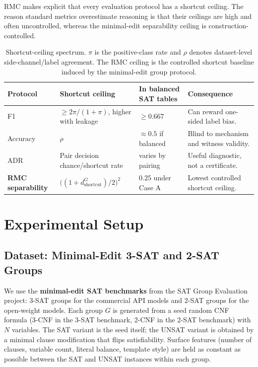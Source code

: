 \documentclass[conference]{IEEEtran}
\theoremstyle{remark}
\newcommand{\shortcutDisc}{d_{\mathrm{shortcut}}^{G}}
\begin{document}
RMC makes explicit that every evaluation
protocol has a shortcut ceiling.
The reason standard metrics overestimate reasoning is that their ceilings are
high and often uncontrolled, whereas the minimal-edit separability ceiling is
construction-controlled.

\begin{table}[t]
\centering
\caption{Shortcut-ceiling spectrum.  $\pi$ is the positive-class rate and $\rho$
denotes dataset-level side-channel/label agreement.  The RMC ceiling is the
controlled shortcut baseline induced by the minimal-edit group protocol.}
\label{tab:ceilings}
\renewcommand{\arraystretch}{1.25}
\begin{tabular}{p{3.0cm}p{5.0cm}p{4.0cm}p{4.5cm}}
\toprule
Protocol & Shortcut ceiling & In balanced SAT tables & Consequence \\
\midrule
F1 
& $\ge 2\pi/(1+\pi)$, higher with leakage 
& $\ge 0.667$ 
& Can reward one-sided label bias. \\
Accuracy 
& $\rho$ 
& $\approx0.5$ if balanced 
& Blind to mechanism and witness validity. \\
ADR 
& Pair decision chance/shortcut rate 
& varies by pairing 
& Useful diagnostic, not a certificate. \\
\textbf{RMC separability} 
& $\bigl((1+\shortcutDisc)/2\bigr)^2$ 
& $\mathbf{0.25}$ under Case A 
& Lowest controlled shortcut ceiling. \\
\bottomrule
\end{tabular}
\end{table}










\section{Experimental Setup}
\label{sec:setup_exp}

\subsection{Dataset: Minimal-Edit 3-SAT and 2-SAT Groups}

We use the \textbf{minimal-edit SAT benchmarks} from the SAT Group Evaluation project: 3-SAT groups for the commercial API models and 2-SAT groups for the open-weight models.
Each group $G$ is generated from a seed random CNF formula (3-CNF in the 3-SAT benchmark, 2-CNF in the 2-SAT benchmark) with $N$ variables.
The SAT variant is the seed itself; the UNSAT variant is obtained by a minimal clause modification that flips satisfiability.
Surface features (number of clauses, variable count, literal balance, template style) are held as constant as possible between the SAT and UNSAT instances within each group.
\end{document}
